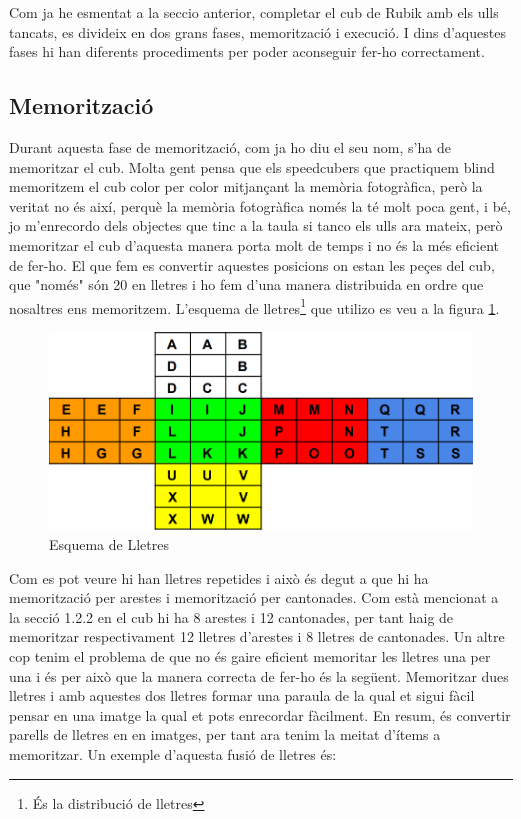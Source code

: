Com ja he esmentat a la seccio anterior, completar el cub de Rubik amb els ulls tancats, es divideix en dos grans fases, memorització i execució. I dins d'aquestes fases hi han diferents procediments per poder aconseguir fer-ho correctament.

\subsection{Memorització}

Durant aquesta fase de memorització, com ja ho diu el seu nom, s'ha de memoritzar el cub. Molta gent pensa que els speedcubers que practiquem blind memoritzem el cub color per color mitjançant la memòria fotogràfica, però la veritat no és així, perquè la memòria fotogràfica només la té molt poca gent, i bé, jo m'enrecordo dels objectes que tinc a la taula si tanco els ulls ara mateix, però memoritzar el cub d'aquesta manera porta molt de temps i no és la més eficient de fer-ho.
El que fem es convertir aquestes posicions on estan les peçes del cub, que "només" són 20 en lletres i ho fem d'una manera distribuida en ordre que nosaltres ens memoritzem. L'esquema de lletres\footnote{És la distribució de lletres} que utilizo es veu a la figura \ref{fig:letter-scheme}.

\begin{figure}[ht]
    \centering
    \includegraphics[width=12cm]{img/figures/letter-scheme.png}
\caption{Esquema de Lletres}
    \label{fig:letter-scheme}
\end{figure}

Com es pot veure hi han lletres repetides i això és degut a que hi ha memorització per arestes i memorització per cantonades. Com està mencionat a la secció 1.2.2 en el cub hi ha 8 arestes i 12 cantonades, per tant haig de memoritzar respectivament 12 lletres d'arestes i 8 lletres de cantonades.
Un altre cop tenim el problema de que no és gaire eficient memoritar les lletres una per una i és per això que la manera correcta de fer-ho és la següent. Memoritzar dues lletres i amb aquestes dos lletres formar una paraula de la qual et sigui fàcil pensar en una imatge la qual et pots enrecordar fàcilment. En resum, és convertir parells de lletres en en imatges, per tant ara tenim la meitat d'ítems a memoritzar. Un exemple d'aquesta fusió de lletres és: 
\vspace{0.25cm}

